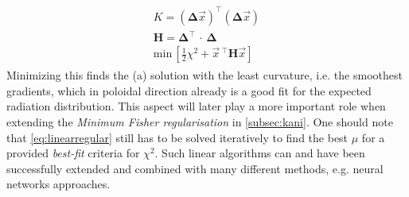 %
    \begin{align}%
        \begin{split}\label{eq:linearregular}%
            K=\left(\pmb{\Delta}\vec{x}\right)^{\intercal}\left(\pmb{\Delta}\vec{x}\right)\\%
            \mathbf{H}=\pmb{\Delta}^{\intercal}\,\cdot\,\pmb{\Delta}\\%
            \text{min}\,\left[\frac{1}{2}\chi^{2}+\vec{x}\,^{\intercal}\mathbf{H}\vec{x}\right]%
        \end{split}%
    \end{align}%
%
    Minimizing this finds the (a) solution with the least curvature, i.e. the smoothest gradients, which in poloidal direction already is a good fit for the expected radiation distribution. This aspect will later play a more important role when extending the \textit{Minimum Fisher regularisation} in \cref{subsec:kani}. One should note that \cref{eq:linearregular} still has to be solved iteratively to find the best $\mu$ for a provided \textit{best-fit} criteria for $\chi^{2}$. Such linear algorithms can and have been successfully extended and combined with many different methods, e.g. neural networks approaches\cite{Parker1977,Peng1993,Steriti1992}.%
%
